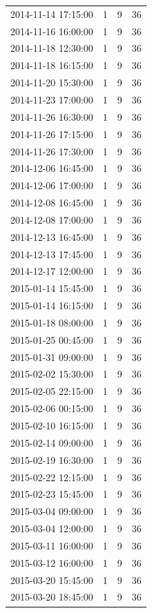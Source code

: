 \begin{tabular}{lrrr}
2014-11-14 17:15:00 & 1 & 9 & 36 \\
2014-11-16 16:00:00 & 1 & 9 & 36 \\
2014-11-18 12:30:00 & 1 & 9 & 36 \\
2014-11-18 16:15:00 & 1 & 9 & 36 \\
2014-11-20 15:30:00 & 1 & 9 & 36 \\
2014-11-23 17:00:00 & 1 & 9 & 36 \\
2014-11-26 16:30:00 & 1 & 9 & 36 \\
2014-11-26 17:15:00 & 1 & 9 & 36 \\
2014-11-26 17:30:00 & 1 & 9 & 36 \\
2014-12-06 16:45:00 & 1 & 9 & 36 \\
2014-12-06 17:00:00 & 1 & 9 & 36 \\
2014-12-08 16:45:00 & 1 & 9 & 36 \\
2014-12-08 17:00:00 & 1 & 9 & 36 \\
2014-12-13 16:45:00 & 1 & 9 & 36 \\
2014-12-13 17:45:00 & 1 & 9 & 36 \\
2014-12-17 12:00:00 & 1 & 9 & 36 \\
2015-01-14 15:45:00 & 1 & 9 & 36 \\
2015-01-14 16:15:00 & 1 & 9 & 36 \\
2015-01-18 08:00:00 & 1 & 9 & 36 \\
2015-01-25 00:45:00 & 1 & 9 & 36 \\
2015-01-31 09:00:00 & 1 & 9 & 36 \\
2015-02-02 15:30:00 & 1 & 9 & 36 \\
2015-02-05 22:15:00 & 1 & 9 & 36 \\
2015-02-06 00:15:00 & 1 & 9 & 36 \\
2015-02-10 16:15:00 & 1 & 9 & 36 \\
2015-02-14 09:00:00 & 1 & 9 & 36 \\
2015-02-19 16:30:00 & 1 & 9 & 36 \\
2015-02-22 12:15:00 & 1 & 9 & 36 \\
2015-02-23 15:45:00 & 1 & 9 & 36 \\
2015-03-04 09:00:00 & 1 & 9 & 36 \\
2015-03-04 12:00:00 & 1 & 9 & 36 \\
2015-03-11 16:00:00 & 1 & 9 & 36 \\
2015-03-12 16:00:00 & 1 & 9 & 36 \\
2015-03-20 15:45:00 & 1 & 9 & 36 \\
2015-03-20 18:45:00 & 1 & 9 & 36 \\

\end{tabular}
